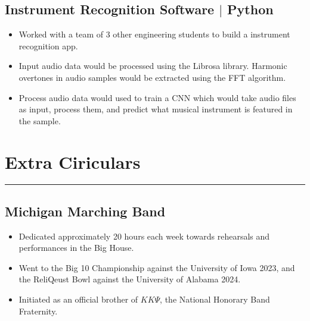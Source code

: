 \documentclass[10pt, letterpaper]{article}
\begin{document}
\subsection*{Instrument Recognition Software $\vert$ Python}
\begin{itemize}[noitemsep]
	\item Worked with a team of 3 other engineering students to build a instrument recognition app.
	\item Input audio data would be processed using the Librosa library. Harmonic overtones in audio samples would be extracted using the FFT algorithm.
	\item Process audio data would used to train a CNN which would take audio files as input, process them,
	and predict what musical instrument is featured in the sample.
\end{itemize}

\section*{Extra Ciriculars}
\hrule
\vspace{7pt}

\subsection*{Michigan Marching Band}
\begin{itemize}[noitemsep]
	\item Dedicated approximately 20 hours each week towards rehearsals and performances in the Big House.
	\item Went to the Big 10 Championship against the University of Iowa 2023,
		and the ReliQeust Bowl against the University of Alabama 2024.
	\item Initiated as an official brother of $K K\Psi$, the National Honorary Band Fraternity.
\end{itemize}
\end{document}
